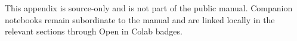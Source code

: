 
\noindent This appendix is source-only and is not part of the public manual. Companion notebooks remain subordinate to the manual and are linked locally in the relevant sections through Open in Colab badges.
